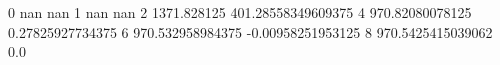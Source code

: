 0 nan nan
1 nan nan
2 1371.828125 401.28558349609375
4 970.82080078125 0.27825927734375
6 970.532958984375 -0.00958251953125
8 970.5425415039062 0.0
